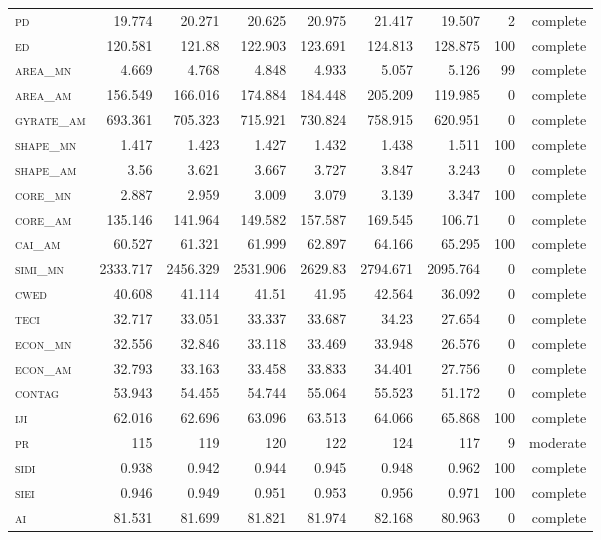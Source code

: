\begin{table}[htbp]
\begin{tabular}{@{}lrrrrr|rrr@{}}
 \midrule
\textsc{pd        } & 19.774   & 20.271   & 20.625   & 20.975   & 21.417   & 19.507   & 2   & complete  \\ 
\textsc{ed        } & 120.581  & 121.88   & 122.903  & 123.691  & 124.813  & 128.875  & 100 & complete  \\
\textsc{area\_mn  } & 4.669    & 4.768    & 4.848    & 4.933    & 5.057    & 5.126    & 99  & complete   \\
\textsc{area\_am  } & 156.549  & 166.016  & 174.884  & 184.448  & 205.209  & 119.985  & 0   & complete \\
\textsc{gyrate\_am} & 693.361  & 705.323  & 715.921  & 730.824  & 758.915  & 620.951  & 0   & complete \\
\textsc{shape\_mn } & 1.417    & 1.423    & 1.427    & 1.432    & 1.438    & 1.511    & 100 & complete  \\
\textsc{shape\_am } & 3.56     & 3.621    & 3.667    & 3.727    & 3.847    & 3.243    & 0   & complete \\
\textsc{core\_mn  } & 2.887    & 2.959    & 3.009    & 3.079    & 3.139    & 3.347    & 100 & complete  \\
\textsc{core\_am  } & 135.146  & 141.964  & 149.582  & 157.587  & 169.545  & 106.71   & 0   & complete \\
\textsc{cai\_am   } & 60.527   & 61.321   & 61.999   & 62.897   & 64.166   & 65.295   & 100 & complete  \\
\textsc{simi\_mn  } & 2333.717 & 2456.329 & 2531.906 & 2629.83  & 2794.671 & 2095.764 & 0   & complete \\
\textsc{cwed      } & 40.608   & 41.114   & 41.51    & 41.95    & 42.564   & 36.092   & 0   & complete \\
\textsc{teci      } & 32.717   & 33.051   & 33.337   & 33.687   & 34.23    & 27.654   & 0   & complete \\
\textsc{econ\_mn  } & 32.556   & 32.846   & 33.118   & 33.469   & 33.948   & 26.576   & 0   & complete \\
\textsc{econ\_am  } & 32.793   & 33.163   & 33.458   & 33.833   & 34.401   & 27.756   & 0   & complete \\
\textsc{contag    } & 53.943   & 54.455   & 54.744   & 55.064   & 55.523   & 51.172   & 0   & complete \\
\textsc{iji       } & 62.016   & 62.696   & 63.096   & 63.513   & 64.066   & 65.868   & 100 & complete  \\
\textsc{pr        } & 115      & 119      & 120      & 122      & 124      & 117      & 9   & moderate  \\
\textsc{sidi      } & 0.938    & 0.942    & 0.944    & 0.945    & 0.948    & 0.962    & 100 & complete  \\
\textsc{siei      } & 0.946    & 0.949    & 0.951    & 0.953    & 0.956    & 0.971    & 100 & complete  \\
\textsc{ai        } & 81.531   & 81.699   & 81.821   & 81.974   & 82.168   & 80.963   & 0   & complete \\ \bottomrule
\end{tabular}
\end{table}
